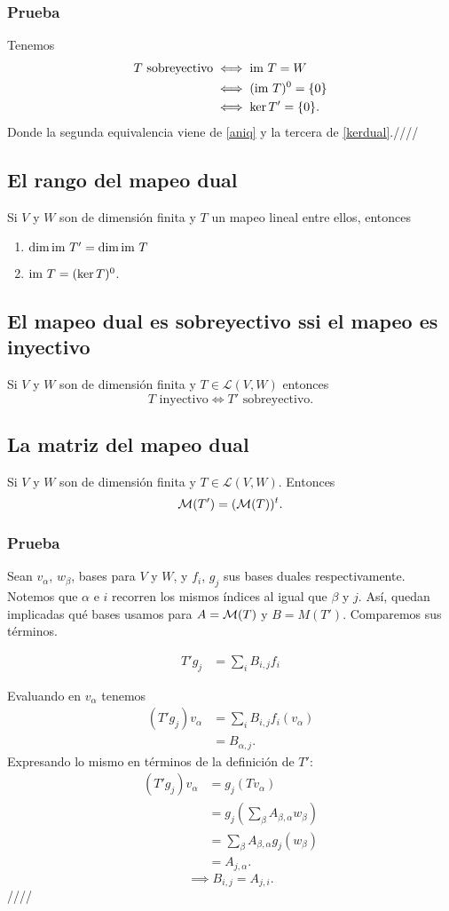 \documentclass{article}
\begin{document}
\subsubsection*{Prueba}
Tenemos
\begin{align*}
    T\text{ sobreyectivo} &\iff \text{im } T = W\\
    &\iff (\text{im } T)^0 = \{0\}\\
    &\iff \ker T' = \{0\}.
\end{align*}
Donde la segunda equivalencia viene de \ref{aniq} y la tercera
de \ref{kerdual}.\hfill ////

\subsection{El rango del mapeo dual}
Si $V$ y $W$ son de dimensión finita y $T$ un mapeo lineal
entre ellos, entonces
\begin{enumerate}
    \item $\dim\text{im } T' = \dim\text{im } T$
    \item $\text{im } T = (\ker T)^0$.
\end{enumerate}

\subsection{El mapeo dual es sobreyectivo ssi el mapeo es inyectivo}
Si $V$ y $W$ son de dimensión finita y $T\in\mathcal{L}(V,W)$
entonces
$$T\text{ inyectivo}\iff T'\text{ sobreyectivo}.$$

\subsection{La matriz del mapeo dual}
Si $V$ y $W$ son de dimensión finita y $T\in\mathcal{L}(V,W)$.
Entonces
$$\mathcal{M}(T') = (\mathcal{M}(T))^t.$$
\subsubsection*{Prueba}
Sean $v_\alpha$, $w_\beta$, bases para $V$ y $W$, y $f_i$, $g_j$ sus
bases duales respectivamente.
Notemos que $\alpha$ e $i$ recorren los mismos índices al igual que
$\beta$ y $j$.
Así, quedan implicadas qué bases usamos para
$A=\mathcal{M}(T)$ y $B=M(T')$. Comparemos sus términos.

\begin{align*}
    T'g_j &= \sum_i B_{i,j} f_i
\end{align*}

Evaluando en $v_\alpha$ tenemos
\begin{align*}
    (T'g_j)v_\alpha &= \sum_i B_{i,j} f_i(v_\alpha)\\
    &= B_{\alpha,j}.
\end{align*}
Expresando lo mismo en términos de la definición de $T'$:
\begin{align*}
    (T'g_j)v_\alpha &= g_j(Tv_\alpha)\\
    &= g_j\left(\sum_\beta A_{\beta,\alpha} w_\beta\right)\\
    &=\sum_\beta A_{\beta,\alpha} g_j(w_\beta)\\
    &= A_{j,\alpha}.
\end{align*}
$$\implies B_{i,j} = A_{j,i}.$$
\hfill ////
\end{document}
